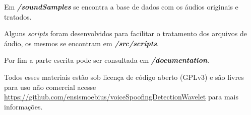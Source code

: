 \begin{apendicesenv}
		\par Em \textit{\textbf{/soundSamples}} se encontra a base de dados com os áudios originais e tratados.
		
		\par Alguns \textit{scripts} foram desenvolvidos para facilitar o tratamento dos arquivos de áudio, os mesmos se encontram em \textbf{\textit{/src/scripts}}.
		
		\par Por fim a parte escrita pode ser consultada em \textit{\textbf{/documentation}}.
		
		\par Todos esses materiais estão sob licença de código aberto (GPLv3) e são livres para uso não comercial acesse   \href{https://github.com/ensismoebius/voiceSpoofingDetectionWavelet}{https://github.com/ensismoebius/voiceSpoofingDetectionWavelet} para mais informações.
\end{apendicesenv}